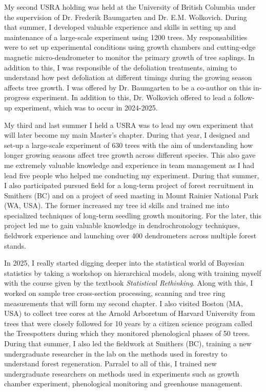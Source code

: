 \documentclass{article}
\begin{document}
My second USRA holding was held at the University of British Columbia under the supervision of Dr. Frederik Baumgarten and Dr. E.M. Wolkovich. During that summer, I developed valuable experience and skills in setting up and maintenance of a large-scale experiment using 1200 trees. My responsabilities were to set up experimental conditions using growth chambers and cutting-edge magnetic micro-dendrometer to monitor the primary growth of tree saplings. In addition to this, I was responsible of the defoliation treatments, aiming to understand how pest defoliation at different timings during the growing season affects tree growth. I was offered by Dr. Baumgarten to be a co-author on this in-progress experiment. In addition to this, Dr. Wolkovich offered to lead a follow-up experiment, which was to occur in 2024-2025.

My third and last summer I held a USRA was to lead my own experiment that will later become my main Master's chapter. During that year, I designed and set-up a large-scale experiment of 630 trees with the aim of understanding how longer growing seasons affect tree growth across different species. This also gave me extremely valuable knowledge and experience in team management as I had lead five people who helped me conducting my experiment. During that summer, I also participated pursued field for a long-term project of forest recruitment in Smithers (BC) and on a project of seed masting in Mount Rainier National Park (WA, USA). The former increased my tree id skills and trained me into specialized techniques of long-term seedling growth monitoring. For the later, this project led me to gain valuable knowledge in dendrochronology techniques, fieldwork experience and launching over 400 dendrometers across multiple forest stands. 

In 2025, I really started digging deeper into the statistical world of Bayesian statistics by taking a workshop on hierarchical models, along with training myself with the course given by the textbook \textit{Statistical Rethinking}. Along with this, I worked on sample tree cross-section processing, scanning and tree ring measurements that will form my second chapter. I also visited Boston (MA, USA) to collect tree cores at the Arnold Arboretum of Harvard University from trees that were closely followed for 10 years by a citizen science program called the Treespotters during which they monitored phenological phases of 50 trees. During that summer, I also led the fieldwork at Smithers (BC), training a new undergraduate researcher in the lab on the methods used in forestry to understand forest regeneration. Parralel to all of this, I trained new undergraduate researchers on methods used in experiments such as growth chamber experiment, phenological monitoring and greenhouse management. 
\end{document}

